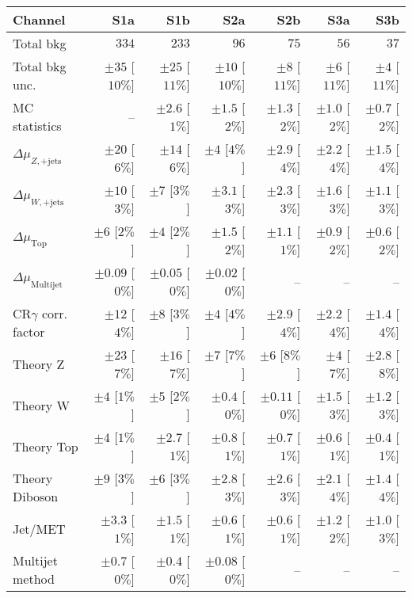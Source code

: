 
\begin{table}[tbp]
\scriptsize
\begin{center}
\begin{tabular}{|lrrrrrr|}
\hline
Channel  &  \textbf{ S1a } & \textbf{ S1b } & \textbf{ S2a } & \textbf{ S2b } & \textbf{ S3a } & \textbf{ S3b }  \\ \hline
Total bkg  &  $334$  &  $233$  &  $96$  &  $75$  &  $56$  &  $37$ \\
Total bkg unc.  &  $\pm 35$  [$10\%$]  &  $\pm 25$  [$11\%$]  &  $\pm 10$  [$10\%$]  &  $\pm 8$  [$11\%$]  &  $\pm 6$  [$11\%$]  &  $\pm 4$  [$11\%$] \\
\hline
MC statistics  &   --    &  $\pm 2.6$ [$1\%$]  &  $\pm 1.5$ [$2\%$]  &  $\pm 1.3$ [$2\%$]  &  $\pm 1.0$ [$2\%$]  &  $\pm 0.7$ [$2\%$] \\
$\Delta\mu_{Z,\mathrm{+jets}}$    &  $\pm 20$ [$6\%$]  &  $\pm 14$ [$6\%$]  &  $\pm 4$ [$4\%$]  &  $\pm 2.9$ [$4\%$]  &  $\pm 2.2$ [$4\%$]  &  $\pm 1.5$ [$4\%$] \\
$\Delta\mu_{W,\mathrm{+jets}}$    &  $\pm 10$ [$3\%$]  &  $\pm 7$ [$3\%$]  &  $\pm 3.1$ [$3\%$]  &  $\pm 2.3$ [$3\%$]  &  $\pm 1.6$ [$3\%$]  &  $\pm 1.1$ [$3\%$] \\
$\Delta\mu_{  \mathrm{ Top}}$       &  $\pm 6$ [$2\%$]  &  $\pm 4$ [$2\%$]  &  $\pm 1.5$ [$2\%$]  &  $\pm 1.1$ [$1\%$]  &  $\pm 0.9$ [$2\%$]  &  $\pm 0.6$ [$2\%$] \\
$\Delta\mu_{  \mathrm{ Multijet}}$  &  $\pm 0.09$ [$0\%$]  &  $\pm 0.05$ [$0\%$]  &  $\pm 0.02$ [$0\%$]  &   --    &   --    &   --   \\
CR$\gamma$ corr. factor  &  $\pm 12$ [$4\%$]  &  $\pm 8$ [$3\%$]  &  $\pm 4$ [$4\%$]  &  $\pm 2.9$ [$4\%$]  &  $\pm 2.2$ [$4\%$]  &  $\pm 1.4$ [$4\%$] \\
Theory Z  &  $\pm 23$ [$7\%$]  &  $\pm 16$ [$7\%$]  &  $\pm 7$ [$7\%$]  &  $\pm 6$ [$8\%$]  &  $\pm 4$ [$7\%$]  &  $\pm 2.8$ [$8\%$] \\
Theory W  &  $\pm 4$ [$1\%$]  &  $\pm 5$ [$2\%$]  &  $\pm 0.4$ [$0\%$]  &  $\pm 0.11$ [$0\%$]  &  $\pm 1.5$ [$3\%$]  &  $\pm 1.2$ [$3\%$] \\
Theory Top   &  $\pm 4$ [$1\%$]  &  $\pm 2.7$ [$1\%$]  &  $\pm 0.8$ [$1\%$]  &  $\pm 0.7$ [$1\%$]  &  $\pm 0.6$ [$1\%$]  &  $\pm 0.4$ [$1\%$] \\
Theory Diboson  &  $\pm 9$ [$3\%$]  &  $\pm 6$ [$3\%$]  &  $\pm 2.8$ [$3\%$]  &  $\pm 2.6$ [$3\%$]  &  $\pm 2.1$ [$4\%$]  &  $\pm 1.4$ [$4\%$] \\
Jet/MET   &  $\pm 3.3$ [$1\%$]  &  $\pm 1.5$ [$1\%$]  &  $\pm 0.6$ [$1\%$]  &  $\pm 0.6$ [$1\%$]  &  $\pm 1.2$ [$2\%$]  &  $\pm 1.0$ [$3\%$] \\
Multijet method  &  $\pm 0.7$ [$0\%$]  &  $\pm 0.4$ [$0\%$]  &  $\pm 0.08$ [$0\%$]  &   --    &   --    &   --   \\
\hline
\end{tabular}


\end{center}
\end{table}
